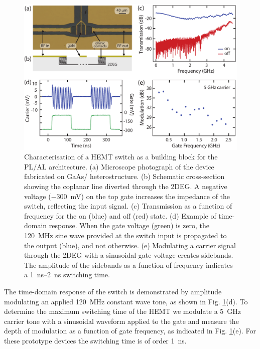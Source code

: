 \begin{figure}
\centering
\includegraphics[width=0.8\linewidth]{Fig2_arch}
\caption[Characterization of a rf HEMT switch]{\label{fig:HEMTswitch}Characterisation of a HEMT switch as a building block for the PL/AL architecture. (a) Microscope photograph of the device fabricated on GaAs/ heterostructure. (b) Schematic cross-section showing the coplanar line diverted through the 2DEG. A negative voltage (\SI{-300}{\milli\volt}) on the top gate increases the impedance of the switch, reflecting the input signal. (c) Transmission as a function of frequency for the on (blue) and off (red) state. (d) Example of time-domain response. When the gate voltage (green) is zero, the \SI{120}{\mega\hertz} sine wave provided at the switch input is propagated to the output (blue), and not otherwise. (e) Modulating a carrier signal through the 2DEG with a sinusoidal gate voltage creates sidebands. The amplitude of the sidebands as a function of frequency indicates a \SIrange{1}{2}{\nano\second} switching time.}
\end{figure}

The time-domain response of the switch is demonstrated by amplitude modulating an applied \SI{120}{\mega\hertz} constant wave tone, as shown in Fig. \ref{fig:HEMTswitch}(d). To determine the maximum switching time of the HEMT we modulate a \SI{5}{\giga\hertz} carrier tone with a sinusoidal waveform applied to the gate and measure the depth of modulation as a function of gate frequency, as indicated in Fig. \ref{fig:HEMTswitch}(e). For these prototype devices the switching time is of order \SI{1}{\nano\second}.


